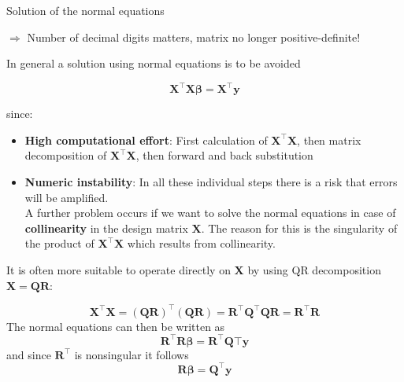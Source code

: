 \begin{vbframe}{Solution of the normal equations}
\normalsize



\vspace{0.4cm}
$\Rightarrow$ Number of decimal digits matters, matrix no longer positive-definite!

\framebreak

In general a solution using  normal equations is to be avoided

$$
\mathbf{X}^\top\mathbf{X}\boldsymbol{\beta} = \mathbf{X}^\top\mathbf{y}
$$

since:

\begin{itemize}
\item \textbf{High computational effort}: First calculation of $\bm{X}^\top\bm{X}$, then matrix decomposition of $\bm{X}^\top\bm{X}$, then forward and back substitution
\item \textbf{Numeric instability}: In all these individual steps there is a risk that errors will be amplified.\\
\medskip
A further problem occurs if we want to solve the normal equations in case of \textbf{collinearity} in the design matrix $\mathbf{X}$.
The reason for this is the singularity of the product of $\mathbf{X}^\top\mathbf{X}$ which results from collinearity.
\end{itemize}

It is often more suitable to operate directly on $\mathbf{X}$ by using QR decomposition $\mathbf{X} = \mathbf{QR}$:

$$
\mathbf{X}^\top\mathbf{X} = (\mathbf{QR})^\top(\mathbf{QR}) = \mathbf{R}^\top\mathbf{Q}^\top\mathbf{QR} =
\mathbf{R}^\top\mathbf{R}
$$
The normal equations can then be written as
$$
\mathbf{R}^\top\mathbf{R}\boldsymbol{\beta} = \mathbf{R}^\top\mathbf{Q}\top\mathbf{y}
$$
and since $\mathbf{R}^\top$ is nonsingular it follows
$$
\mathbf{R}\boldsymbol{\beta} = \mathbf{Q}^\top\mathbf{y} %
$$


\end{vbframe}
